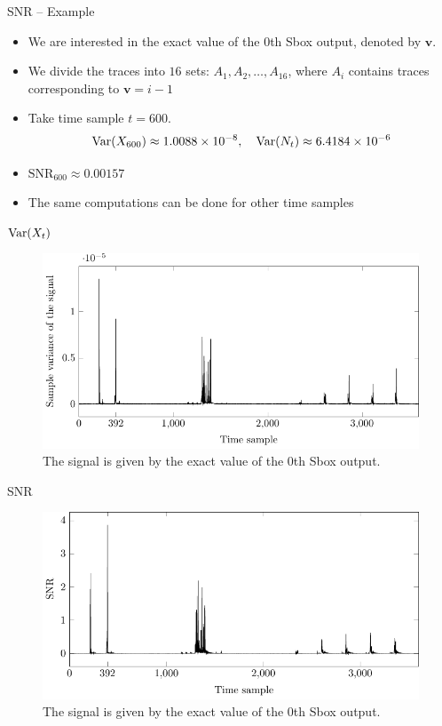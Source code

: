 \begin{frame}{SNR -- Example}
    \begin{example}
        \begin{itemize}
            \item We are interested in the exact value of the $0$th Sbox output, denoted by $\boldsymbol{v}$.
            \item We divide the traces into $16$ sets: $A_1,A_2,\dots,A_{16}$, where $A_i$ contains traces corresponding to $\boldsymbol{v}=i-1$
            \item Take time sample $t=600$.
\[
\textrm{Var}{\left(X_{600}\right)}\approx1.0088\times10^{-8},\quad
\textrm{Var}{\left(N_t\right)}\approx6.4184\times10^{-6}
\]
\item $\text{SNR}_{600}\approx0.00157$
\item The same computations can be done for other time samples
        \end{itemize}
    \end{example}
\end{frame}

\begin{frame}{$\textrm{Var}{\left(X_t\right)}$}
\begin{figure} 
        \centering
        \includegraphics{fig/signal_identity_model.pdf}
        \caption{
        The signal is given by the exact value of the $0$th Sbox output.}
    \end{figure}
\end{frame}

\begin{frame}{SNR}
     \begin{figure} 
        \centering
        \includegraphics{fig/SNR_identity_model.pdf}
        \caption{
        The signal is given by the exact value of the $0$th Sbox output.}
    \end{figure}
\end{frame}

